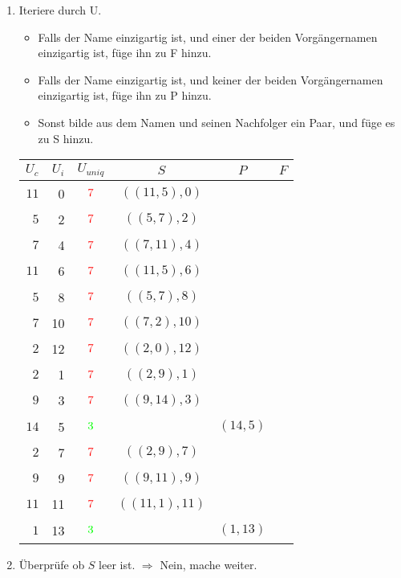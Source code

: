 \begin{enumerate}
\item 
Iteriere durch U.
\begin{itemize}
\item Falls der Name einzigartig ist, und einer der beiden Vorgängernamen einzigartig ist, füge ihn zu F hinzu.
\item Falls der Name einzigartig ist, und keiner der beiden Vorgängernamen einzigartig ist, füge ihn zu P hinzu.
\item Sonst bilde aus dem Namen und seinen Nachfolger ein Paar, und füge es zu S hinzu.
\end{itemize}

\begin{center}
\small\begin{tabular}{rrcccc}
\toprule 
 $U_c$ & $U_i$ & $U_{uniq}$ &     $S$      &   $P$   &   $F$   \\
\midrule 
$11$ & 0 & $$\xmarkc$$ & $((11, 5), 0)$ &       &       \\
$ 5$ & 2 & $$\xmarkc$$ & $(( 5, 7), 2)$ &       &       \\
$ 7$ & 4 & $$\xmarkc$$ & $(( 7,11), 4)$ &       &       \\
$11$ & 6 & $$\xmarkc$$ & $((11, 5), 6)$ &       &       \\
$ 5$ & 8 & $$\xmarkc$$ & $(( 5, 7), 8)$ &       &       \\
$ 7$ & 10 & $$\xmarkc$$ & $(( 7, 2),10)$ &       &       \\
$ 2$ & 12 & $$\xmarkc$$ & $(( 2, 0),12)$ &       &       \\
$ 2$ & 1 & $$\xmarkc$$ & $(( 2, 9), 1)$ &       &       \\
$ 9$ & 3 & $$\xmarkc$$ & $(( 9,14), 3)$ &       &       \\
$14$ & 5 & $$\cmarkc$$  &            & $(14, 5)$ &       \\
$ 2$ & 7 & $$\xmarkc$$ & $(( 2, 9), 7)$ &       &       \\
$ 9$ & 9 & $$\xmarkc$$ & $(( 9,11), 9)$ &       &       \\
$11$ & 11 & $$\xmarkc$$ & $((11, 1),11)$ &       &       \\
$ 1$ & 13 & $$\cmarkc$$  &            & $( 1,13)$ &       \\
\bottomrule 
\end{tabular}
\end{center}

\item 
Überprüfe ob $S$ leer ist.
$\Rightarrow$ Nein, mache weiter.


\end{enumerate}

